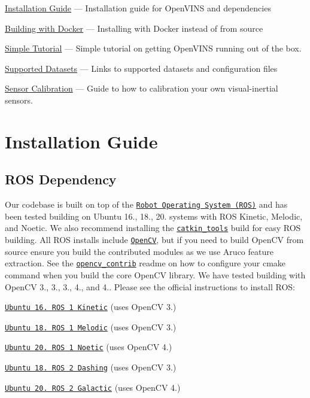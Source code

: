 \begin{DoxyItemize}
\item \hyperlink{gs-installing}{Installation Guide} --- Installation guide for Open\+V\+I\+NS and dependencies
\item \hyperlink{dev-docker}{Building with Docker} --- Installing with Docker instead of from source
\item \hyperlink{gs-tutorial}{Simple Tutorial} --- Simple tutorial on getting Open\+V\+I\+NS running out of the box.
\item \hyperlink{gs-datasets}{Supported Datasets} --- Links to supported datasets and configuration files
\item \hyperlink{gs-calibration}{Sensor Calibration} --- Guide to how to calibration your own visual-\/inertial sensors. 
\end{DoxyItemize}\hypertarget{gs-installing}{}\section{Installation Guide}\label{gs-installing}
\hypertarget{gs-installing_gs-install-ros}{}\subsection{R\+O\+S Dependency}\label{gs-installing_gs-install-ros}
Our codebase is built on top of the \href{https://www.ros.org/}{\tt Robot Operating System (R\+OS)} and has been tested building on Ubuntu 16., 18., 20. systems with R\+OS Kinetic, Melodic, and Noetic. We also recommend installing the \href{https://github.com/catkin/catkin_tools}{\tt catkin\+\_\+tools} build for easy R\+OS building. All R\+OS installs include \href{https://github.com/opencv/opencv}{\tt Open\+CV}, but if you need to build Open\+CV from source ensure you build the contributed modules as we use Aruco feature extraction. See the \href{https://github.com/opencv/opencv_contrib}{\tt opencv\+\_\+contrib} readme on how to configure your cmake command when you build the core Open\+CV library. We have tested building with Open\+CV 3., 3., 3., 4., and 4.. Please see the official instructions to install R\+OS\+:


\begin{DoxyItemize}
\item \href{http://wiki.ros.org/kinetic/Installation/Ubuntu}{\tt Ubuntu 16. R\+OS 1 Kinetic} (uses Open\+CV 3.)
\item \href{http://wiki.ros.org/melodic/Installation/Ubuntu}{\tt Ubuntu 18. R\+OS 1 Melodic} (uses Open\+CV 3.)
\item \href{http://wiki.ros.org/noetic/Installation/Ubuntu}{\tt Ubuntu 20. R\+OS 1 Noetic} (uses Open\+CV 4.)
\item \href{https://docs.ros.org/en/dashing/}{\tt Ubuntu 18. R\+OS 2 Dashing} (uses Open\+CV 3.)
\item \href{https://docs.ros.org/en/galactic/}{\tt Ubuntu 20. R\+OS 2 Galactic} (uses Open\+CV 4.)
\end{DoxyItemize}


